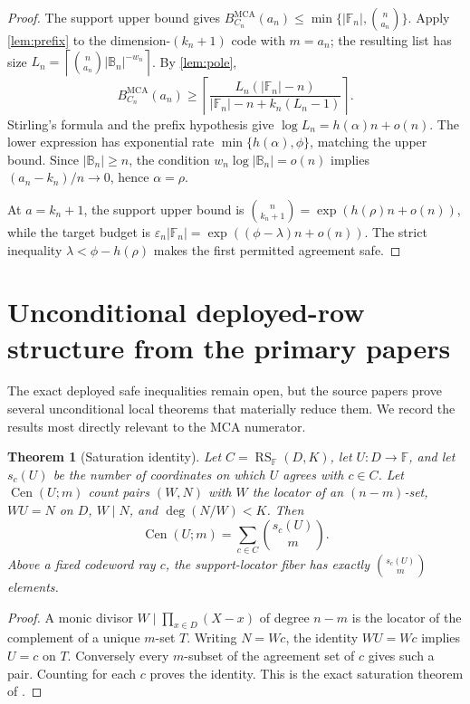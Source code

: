 \documentclass[11pt,a4paper]{amsart}
\numberwithin{equation}{section}
\newtheorem{theorem}{Theorem}[section]
\theoremstyle{remark}
\DeclareMathOperator{\RS}{RS}
\DeclareMathOperator{\MCA}{MCA}
\newcommand{\F}{\mathbb F}
\newcommand{\B}{\mathbb B}
\newcommand{\eps}{\varepsilon}
\newcommand{\abs}[1]{\lvert#1\rvert}
\newcommand{\ceil}[1]{\left\lceil#1\right\rceil}
\newcommand{\Cen}{\operatorname{Cen}}
\begin{document}
\begin{proof}
The support upper bound gives $B_{C_n}^{\MCA}(a_n)\le\min\{\abs{\F_n},\binom n{a_n}\}$.  Apply \cref{lem:prefix} to the dimension-$(k_n+1)$ code with $m=a_n$; the resulting list has size $L_n=\ceil{\binom n{a_n}\abs{\B_n}^{-w_n}}$.  By \cref{lem:pole},
\[
 B_{C_n}^{\MCA}(a_n)\ge
 \ceil{\frac{L_n(\abs{\F_n}-n)}{\abs{\F_n}-n+k_n(L_n-1)}}.
\]
Stirling's formula and the prefix hypothesis give $\log L_n=h(\alpha)n+o(n)$.  The lower expression has exponential rate $\min\{h(\alpha),\phi\}$, matching the upper bound.  Since $\abs{\B_n}\ge n$, the condition $w_n\log\abs{\B_n}=o(n)$ implies $(a_n-k_n)/n\to0$, hence $\alpha=\rho$.

At $a=k_n+1$, the support upper bound is $\binom n{k_n+1}=\exp(h(\rho)n+o(n))$, while the target budget is $\eps_n\abs{\F_n}=\exp((\phi-\lambda)n+o(n))$.  The strict inequality $\lambda<\phi-h(\rho)$ makes the first permitted agreement safe.
\end{proof}


\section{Unconditional deployed-row structure from the primary papers}

The exact deployed safe inequalities remain open, but the source papers prove several unconditional local theorems that materially reduce them.  We record the results most directly relevant to the MCA numerator.

\begin{theorem}[Saturation identity]\label{thm:saturation-identity}
Let $C=\RS_{\F}(D,K)$, let $U:D\to\F$, and let $s_c(U)$ be the number of coordinates on which $U$ agrees with $c\in C$.  Let $\Cen(U;m)$ count pairs $(W,N)$ with $W$ the locator of an $(n-m)$-set, $WU=N$ on $D$, $W\mid N$, and $\deg(N/W)<K$.  Then
\[
 \Cen(U;m)=\sum_{c\in C}\binom{s_c(U)}m.
\]
Above a fixed codeword ray $c$, the support-locator fiber has exactly $\binom{s_c(U)}m$ elements.
\end{theorem}

\begin{proof}
A monic divisor $W\mid\prod_{x\in D}(X-x)$ of degree $n-m$ is the locator of the complement of a unique $m$-set $T$.  Writing $N=Wc$, the identity $WU=Wc$ implies $U=c$ on $T$.  Conversely every $m$-subset of the agreement set of $c$ gives such a pair.  Counting for each $c$ proves the identity.  This is the exact saturation theorem of \cite{ChoGF26}.
\end{proof}
\end{document}
